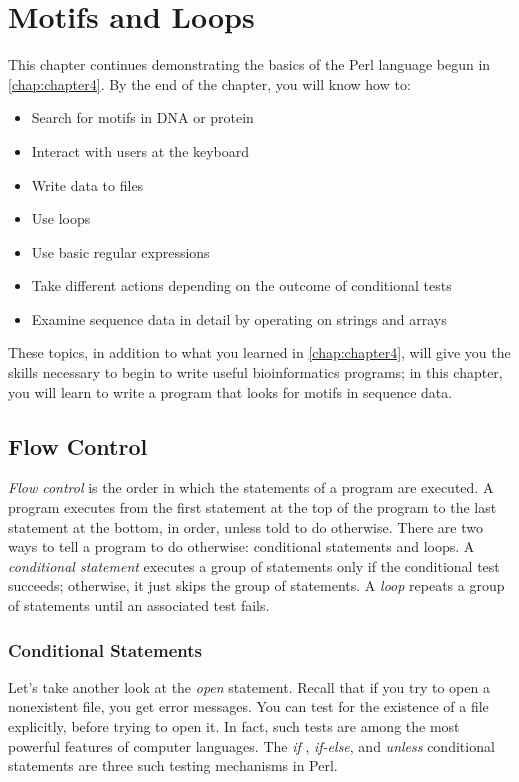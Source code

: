 \chapter{Motifs and Loops}
\label{chap:chapter5}
\minitoc

This chapter continues demonstrating the basics of the Perl language begun in \autoref{chap:chapter4}. By the end of the chapter, you will know how to:

\begin{itemize}
  \item Search for motifs in DNA or protein
  \item Interact with users at the keyboard
  \item Write data to files
  \item Use loops
  \item Use basic regular expressions
  \item Take different actions depending on the outcome of conditional tests
  \item Examine sequence data in detail by operating on strings and arrays
\end{itemize}

These topics, in addition to what you learned in \autoref{chap:chapter4}, will give you the skills necessary to begin to write useful bioinformatics programs; in this chapter, you will learn to write a program that looks for motifs in sequence data. 

\section{Flow Control}
\textit{Flow control} is the order in which the statements of a program are executed. A program executes from the first statement at the top of the program to the last statement at the bottom, in order, unless told to do otherwise. There are two ways to tell a program to do otherwise: conditional statements and loops. A \textit{conditional statement} executes a group of statements only if the conditional test succeeds; otherwise, it just skips the group of statements. A \textit{loop} repeats a group of statements until an associated test fails.

\subsection{Conditional Statements}
Let's take another look at the \textit{open} statement. Recall that if you try to open a nonexistent file, you get error messages. You can test for the existence of a file explicitly, before trying to open it. In fact, such tests are among the most powerful features of computer languages. The \textit{if} , \textit{if-else}, and \textit{unless} conditional statements are three such testing mechanisms in Perl.

